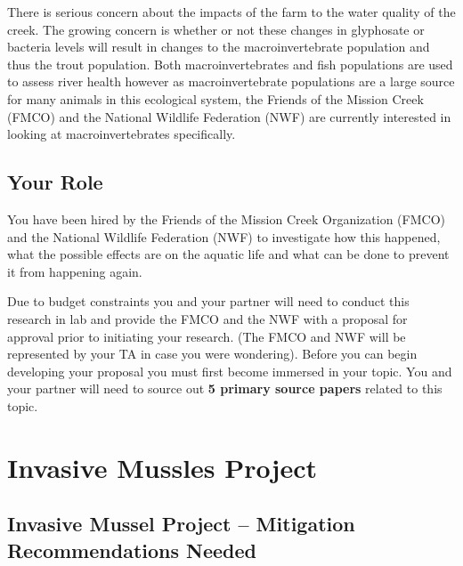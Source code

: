 \documentclass[
]{book}
\begin{document}
There is serious concern about the impacts of the farm to the water quality of the creek. The growing concern is whether or not these changes in glyphosate or bacteria levels will result in changes to the macroinvertebrate population and thus the trout population. Both macroinvertebrates and fish populations are used to assess river health however as macroinvertebrate populations are a large source for many animals in this ecological system, the Friends of the Mission Creek (FMCO) and the National Wildlife Federation (NWF) are currently interested in looking at macroinvertebrates specifically.

\hypertarget{your-role-1}{%
\subsection*{Your Role}\label{your-role-1}}

You have been hired by the Friends of the Mission Creek Organization (FMCO) and the National Wildlife Federation (NWF) to investigate how this happened, what the possible effects are on the aquatic life and what can be done to prevent it from happening again.

Due to budget constraints you and your partner will need to conduct this research in lab and provide the FMCO and the NWF with a proposal for approval prior to initiating your research. (The FMCO and NWF will be represented by your TA in case you were wondering). Before you can begin developing your proposal you must first become immersed in your topic. You and your partner will need to source out \textbf{5 primary source papers} related to this topic.

\hypertarget{invasive-mussles-project}{%
\section*{Invasive Mussles Project}\label{invasive-mussles-project}}

\hypertarget{invasive-mussel-project-mitigation-recommendations-needed}{%
\subsection*{Invasive Mussel Project -- Mitigation Recommendations Needed}\label{invasive-mussel-project-mitigation-recommendations-needed}}
\end{document}
